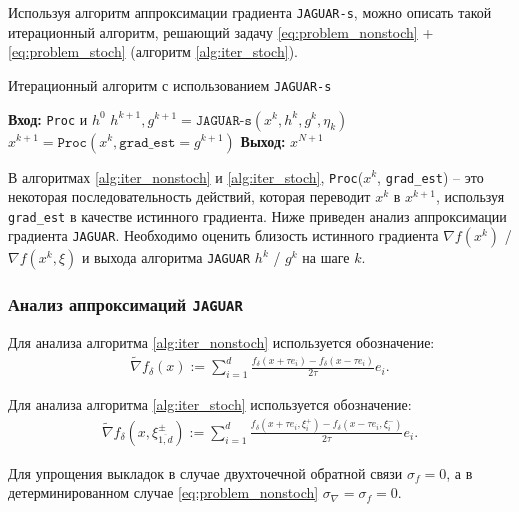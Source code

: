    Используя алгоритм аппроксимации градиента \texttt{JAGUAR-s}, можно описать такой итерационный алгоритм, решающий задачу \eqref{eq:problem_nonstoch} + \eqref{eq:problem_stoch} (алгоритм \ref{alg:iter_stoch}).

    \begin{algorithm}[H]
        \caption{Итерационный алгоритм с использованием \texttt{JAGUAR-s}} \label{alg:iter_stoch}
        \begin{algorithmic}[1]
            \State \textbf{Вход:} \texttt{Proc} и $h^0$
                \State $h^{k + 1}, g^{k + 1} = \texttt{JAGUAR-s}(x^k, h^k, g^k, \eta_k)$
                \State $x^{k + 1} = \texttt{Proc}(x^k, \texttt{grad\_est} = g^{k + 1})$
            \EndFor
            \State \textbf{Выход:} $x^{N + 1}$
        \end{algorithmic}
    \end{algorithm}

    В алгоритмах \ref{alg:iter_nonstoch} и \ref{alg:iter_stoch}, \texttt{Proc}($x^k$, \texttt{grad\_est}) -- это некоторая последовательность действий, которая переводит $x^k$ в $x^{k + 1}$, используя \texttt{grad\_est} в качестве истинного градиента. Ниже приведен анализ аппроксимации градиента \texttt{JAGUAR}. Необходимо оценить близость истинного градиента $\nabla f(x^k)$ / $\nabla f(x^k, \xi)$ и выхода алгоритма \texttt{JAGUAR} $h^k$ / $g^k$ на шаге $k$. 
    
\subsubsection{Анализ аппроксимаций \texttt{JAGUAR}}

    Для анализа алгоритма \ref{alg:iter_nonstoch} используется обозначение:
    \begin{align*}
        \widetilde{\nabla} f_\delta (x) := \sum\limits_{i = 1}^d \frac{f_\delta (x + \tau e_i) - f_\delta (x - \tau e_i)}{2 \tau} e_i. 
    \end{align*}

    Для анализа алгоритма \ref{alg:iter_stoch} используется обозначение:
    \begin{align*}
        \widetilde{\nabla} f_\delta (x, \xi_{\overline{1, d}}^\pm) := \sum\limits_{i = 1}^d \frac{f_\delta (x + \tau e_i, \xi_i^+) - f_\delta (x - \tau e_i, \xi_i^-)}{2 \tau} e_i.
    \end{align*}

    Для упрощения выкладок в случае двухточечной обратной связи $\sigma_f = 0$, а в детерминированном случае \eqref{eq:problem_nonstoch} $\sigma_\nabla = \sigma_f = 0$.
    
